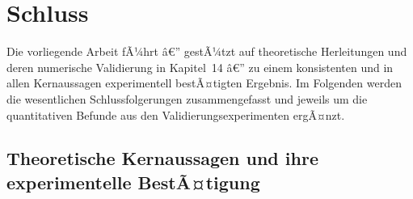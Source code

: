 ﻿\documentclass[12pt,a4paper,titlepage]{report}
\begin{document}
\chapter{Schluss}

Die vorliegende Arbeit fÃ¼hrt â€” gestÃ¼tzt auf theoretische Herleitungen
und deren numerische Validierung in Kapitel~14 â€” zu einem konsistenten
und in allen Kernaussagen experimentell bestÃ¤tigten Ergebnis.
Im Folgenden werden die wesentlichen Schlussfolgerungen zusammengefasst
und jeweils um die quantitativen Befunde aus den Validierungsexperimenten ergÃ¤nzt.

\section*{Theoretische Kernaussagen und ihre experimentelle BestÃ¤tigung}
\end{document}
